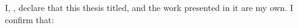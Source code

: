 \documentclass[
11pt, %
oneside, %
english, %
singlespacing, %
]{macthesis} %
\begin{document}
\listoffigures %

\listoftables %



\begin{declaration}
\addchaptertocentry{\authorshipname}

\noindent I, \authorname, declare that this thesis titled, \emph{\ttitle} and the work presented in it are my own. I confirm that:



\end{declaration}


\label{lastoffront}
\clearpage


\mainmatter %
\pagestyle{thesis}
\end{document}
